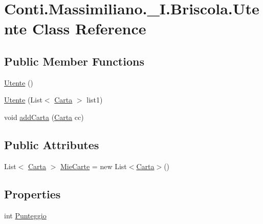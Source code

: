 \hypertarget{class_conti_1_1_massimiliano_1_1__5_i_1_1_briscola_1_1_utente}{}\section{Conti.\+Massimiliano.\+\_\+I.\+Briscola.\+Utente Class Reference}
\label{class_conti_1_1_massimiliano_1_1__5_i_1_1_briscola_1_1_utente}
\subsection*{Public Member Functions}
\begin{DoxyCompactItemize}
\item 
\hyperlink{class_conti_1_1_massimiliano_1_1__5_i_1_1_briscola_1_1_utente_ac9e26e74a26c939616f77a2ae5671fb7}{Utente} ()
\item 
\hyperlink{class_conti_1_1_massimiliano_1_1__5_i_1_1_briscola_1_1_utente_a829e50ab065199b4661dfe4577835515}{Utente} (List$<$ \hyperlink{class_conti_1_1_massimiliano_1_1__5_i_1_1_briscola_1_1_carta}{Carta} $>$ list1)
\item 
void \hyperlink{class_conti_1_1_massimiliano_1_1__5_i_1_1_briscola_1_1_utente_aff18a6e19b71070cf158adfb50464428}{add\+Carta} (\hyperlink{class_conti_1_1_massimiliano_1_1__5_i_1_1_briscola_1_1_carta}{Carta} cc)
\end{DoxyCompactItemize}
\subsection*{Public Attributes}
\begin{DoxyCompactItemize}
\item 
List$<$ \hyperlink{class_conti_1_1_massimiliano_1_1__5_i_1_1_briscola_1_1_carta}{Carta} $>$ \hyperlink{class_conti_1_1_massimiliano_1_1__5_i_1_1_briscola_1_1_utente_ab369b8fe628b0418f5ce653e80a006ed}{Mie\+Carte} = new List$<$\hyperlink{class_conti_1_1_massimiliano_1_1__5_i_1_1_briscola_1_1_carta}{Carta}$>$()
\end{DoxyCompactItemize}
\subsection*{Properties}
\begin{DoxyCompactItemize}
\item 
int \hyperlink{class_conti_1_1_massimiliano_1_1__5_i_1_1_briscola_1_1_utente_a8cef4b6a0f28f1a24146c874556b99a1}{Punteggio}
\end{DoxyCompactItemize}


